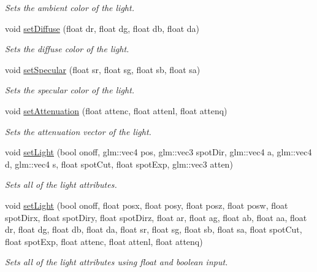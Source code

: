 \begin{DoxyCompactItemize}
\begin{DoxyCompactList}\small\item\em Sets the ambient color of the light. \end{DoxyCompactList}\item 
void \hyperlink{class_light_afd3cabefb467007ccacdbd558821b9b6}{set\+Diffuse} (float dr, float dg, float db, float da)
\begin{DoxyCompactList}\small\item\em Sets the diffuse color of the light. \end{DoxyCompactList}\item 
void \hyperlink{class_light_aeaa2dafb4e81f62b3a72fa984f6abc1e}{set\+Specular} (float sr, float sg, float sb, float sa)
\begin{DoxyCompactList}\small\item\em Sets the specular color of the light. \end{DoxyCompactList}\item 
void \hyperlink{class_light_a5d5dcc7c105441b11db37c97b39f5e1b}{set\+Attenuation} (float attenc, float attenl, float attenq)
\begin{DoxyCompactList}\small\item\em Sets the attenuation vector of the light. \end{DoxyCompactList}\item 
void \hyperlink{class_light_ab2484e1e35f162b962d795e0bea2e337}{set\+Light} (bool onoff, glm\+::vec4 pos, glm\+::vec3 spot\+Dir, glm\+::vec4 a, glm\+::vec4 d, glm\+::vec4 s, float spot\+Cut, float spot\+Exp, glm\+::vec3 atten)
\begin{DoxyCompactList}\small\item\em Sets all of the light attributes. \end{DoxyCompactList}\item 
void \hyperlink{class_light_ab141c608b72924a24f5612eb7ddd3f1d}{set\+Light} (bool onoff, float posx, float posy, float posz, float posw, float spot\+Dirx, float spot\+Diry, float spot\+Dirz, float ar, float ag, float ab, float aa, float dr, float dg, float db, float da, float sr, float sg, float sb, float sa, float spot\+Cut, float spot\+Exp, float attenc, float attenl, float attenq)
\begin{DoxyCompactList}\small\item\em Sets all of the light attributes using float and boolean input. \end{DoxyCompactList}\end{DoxyCompactItemize}


